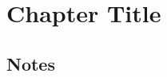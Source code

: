 
\chapter{Chapter Title} 
\label{ch:mychapter}            %

\makeendnotes




%
%
\section*{Notes}
\begin{footnotesize}
\theendnotes
\end{footnotesize}
